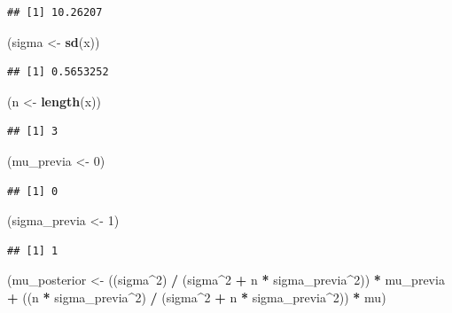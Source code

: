 \documentclass[
  12pt,
]{book}
\newenvironment{Shaded}{\begin{snugshade}}{\end{snugshade}}
\newcommand{\DecValTok}[1]{\textcolor[rgb]{0.00,0.00,0.81}{#1}}
\newcommand{\KeywordTok}[1]{\textcolor[rgb]{0.13,0.29,0.53}{\textbf{#1}}}
\newcommand{\NormalTok}[1]{#1}
\newcommand{\OperatorTok}[1]{\textcolor[rgb]{0.81,0.36,0.00}{\textbf{#1}}}
\newcommand{\StringTok}[1]{\textcolor[rgb]{0.31,0.60,0.02}{#1}}
\begin{document}
\begin{verbatim}
## [1] 10.26207
\end{verbatim}

\begin{Shaded}
\begin{Highlighting}[]
\NormalTok{(sigma \textless{}{-}}\StringTok{ }\KeywordTok{sd}\NormalTok{(x))}
\end{Highlighting}
\end{Shaded}

\begin{verbatim}
## [1] 0.5653252
\end{verbatim}

\begin{Shaded}
\begin{Highlighting}[]
\NormalTok{(n \textless{}{-}}\StringTok{ }\KeywordTok{length}\NormalTok{(x))}
\end{Highlighting}
\end{Shaded}

\begin{verbatim}
## [1] 3
\end{verbatim}

\begin{Shaded}
\begin{Highlighting}[]
\NormalTok{(mu\_previa \textless{}{-}}\StringTok{ }\DecValTok{0}\NormalTok{)}
\end{Highlighting}
\end{Shaded}

\begin{verbatim}
## [1] 0
\end{verbatim}

\begin{Shaded}
\begin{Highlighting}[]
\NormalTok{(sigma\_previa \textless{}{-}}\StringTok{ }\DecValTok{1}\NormalTok{)}
\end{Highlighting}
\end{Shaded}

\begin{verbatim}
## [1] 1
\end{verbatim}

\begin{Shaded}
\begin{Highlighting}[]
\NormalTok{(mu\_posterior \textless{}{-}}\StringTok{ }\NormalTok{((sigma}\OperatorTok{\^{}}\DecValTok{2}\NormalTok{) }\OperatorTok{/}\StringTok{ }\NormalTok{(sigma}\OperatorTok{\^{}}\DecValTok{2} \OperatorTok{+}\StringTok{ }\NormalTok{n }\OperatorTok{*}\StringTok{ }\NormalTok{sigma\_previa}\OperatorTok{\^{}}\DecValTok{2}\NormalTok{)) }\OperatorTok{*}\StringTok{ }\NormalTok{mu\_previa }\OperatorTok{+}\StringTok{ }\NormalTok{((n }\OperatorTok{*}\StringTok{ }\NormalTok{sigma\_previa}\OperatorTok{\^{}}\DecValTok{2}\NormalTok{) }\OperatorTok{/}\StringTok{ }\NormalTok{(sigma}\OperatorTok{\^{}}\DecValTok{2} \OperatorTok{+}\StringTok{ }\NormalTok{n }\OperatorTok{*}\StringTok{ }\NormalTok{sigma\_previa}\OperatorTok{\^{}}\DecValTok{2}\NormalTok{)) }\OperatorTok{*}\StringTok{ }\NormalTok{mu)}
\end{Highlighting}
\end{Shaded}
\end{document}
